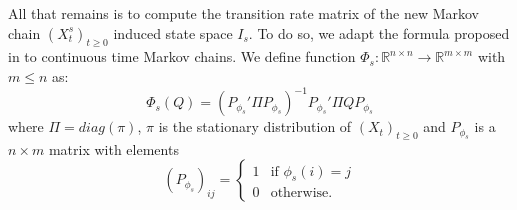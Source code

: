 All that remains is to compute the transition rate matrix of the new Markov chain $(X_t^{s})_{t \ge 0}$ induced  state space $I_s$. To do so, we adapt the formula proposed in \cite{5746509} to continuous time Markov chains. We define function $\Phi_s: \mathbb{R}^{n \times n} \rightarrow \mathbb{R}^{m \times m}$ with $m \le n$ as:
\begin{equation}
	\label{eq:ctmc-state-aggregation}
	\Phi_s(Q) = (P_{\phi_s}' \Pi P_{\phi_s})^{-1} P_{\phi_s}' \Pi Q P_{\phi_s}
\end{equation}
where $\Pi = diag(\pi)$, $\pi$ is the stationary distribution of $(X_t)_{t \ge 0}$ and $P_{\phi_s}$ is a 
$n \times m$ matrix with elements
\begin{equation}
	\nonumber
	\left(P_{\phi_s}\right)_{ij} = 
		\left\{
			\begin{array}{ll}
				1 & \mbox{if } \phi_s(i) = j \\
				0 & \mbox{otherwise}.
			\end{array}
		\right.
\end{equation}




